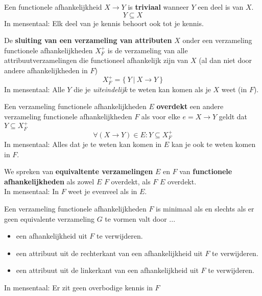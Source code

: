 \documentclass[normaalvormen.tex]{subfiles}
\begin{document}
\begin{de}
Een functionele afhankelijkheid $X\rightarrow Y$ is \textbf{triviaal} wanneer $Y$ een deel is van $X$.
\[
Y \subseteq X
\]
In mensentaal:
Elk deel van je kennis behoort ook tot je kennis.
\end{de}

\begin{de}
De \textbf{sluiting van een verzameling van attributen} $X$ onder een verzameling functionele afhankelijkheden $X_{F}^+$ is de verzameling van alle attribuutverzamelingen die functioneel afhankelijk zijn van $X$ (al dan niet door andere afhankelijkheden in $F$)
\[
X_{F}^{+} = \{\ Y\ |\ X\rightarrow Y\ \}
\]
In mensentaal:
Alle $Y$ die je \emph{uiteindelijk} te weten kan komen als je $X$ weet (in $F$).
\end{de}

\begin{de}
Een verzameling functionele afhankelijkheden $E$ \textbf{overdekt} een andere verzameling functionele afhankelijkheden $F$ als voor elke $e = X\rightarrow Y$ geldt dat $Y \subseteq X_{F}^{+}$
\[
\forall (X \rightarrow Y) \in E: Y \subseteq X_{F}^{+}
\]
In mensentaal:
Alles dat je te weten kan komen in $E$ kan je ook te weten komen in $F$.
\end{de}

\begin{de}
We spreken van \textbf{equivaltente verzamelingen} $E$ en $F$ van \textbf{functionele afhankelijkheden} als zowel $E$ $F$ overdekt, als $F$ $E$ overdekt.\\
In mensentaal: In $F$ weet je evenveel als in $E$.
\end{de}

\begin{de}
Een verzameling functionele afhankelijkheden $F$ is minimaal als en slechts als er geen equivalente verzameling $G$ te vormen valt door  ...
\begin{itemize}
\item een afhankelijkheid uit $F$ te verwijderen.
\item een attribuut uit de rechterkant van een afhankelijkheid uit $F$ te verwijderen.
\item een attribuut uit de linkerkant van een afhankelijkheid uit $F$ te verwijderen.
\end{itemize}
In mensentaal: Er zit geen overbodige kennis in $F$
\end{de}
\end{document}
